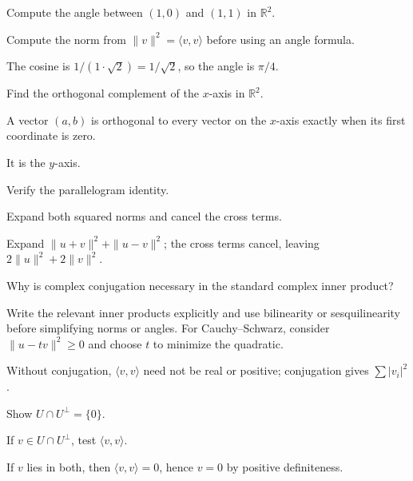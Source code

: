 \begin{exercise}\label{exr:i13-02}
Compute the angle between $(1,0)$ and $(1,1)$ in $\mathbb R^2$.
\end{exercise}
\begin{hint}
Compute the norm from \(\|v\|^2=\langle v,v\rangle\) before using an angle formula.
\end{hint}
\begin{solution}
The cosine is $1/(1\cdot\sqrt2)=1/\sqrt2$, so the angle is $\pi/4$.
\end{solution}

\begin{exercise}\label{exr:i13-03}
Find the orthogonal complement of the $x$-axis in $\mathbb R^2$.
\end{exercise}
\begin{hint}
A vector \((a,b)\) is orthogonal to every vector on the \(x\)-axis exactly when its first coordinate is zero.
\end{hint}
\begin{solution}
It is the $y$-axis.
\end{solution}

\begin{exercise}\label{exr:i13-04}
Verify the parallelogram identity.
\end{exercise}
\begin{hint}
Expand both squared norms and cancel the cross terms.
\end{hint}
\begin{solution}
Expand $\|u+v\|^2+\|u-v\|^2$; the cross terms cancel, leaving $2\|u\|^2+2\|v\|^2$.
\end{solution}

\begin{exercise}\label{exr:i13-05}
Why is complex conjugation necessary in the standard complex inner product?
\end{exercise}
\begin{hint}
Write the relevant inner products explicitly and use bilinearity or sesquilinearity before simplifying norms or angles. For Cauchy--Schwarz, consider \(\|u-tv\|^2\ge0\) and choose \(t\) to minimize the quadratic.
\end{hint}
\begin{solution}
Without conjugation, $\langle v,v\rangle$ need not be real or positive; conjugation gives $\sum|v_i|^2$.
\end{solution}

\begin{exercise}\label{exr:i13-06}
Show $U\cap U^\perp=\{0\}$.
\end{exercise}
\begin{hint}
If \(v\in U\cap U^\perp\), test \(\langle v,v\rangle\).
\end{hint}
\begin{solution}
If $v$ lies in both, then $\langle v,v\rangle=0$, hence $v=0$ by positive definiteness.
\end{solution}

